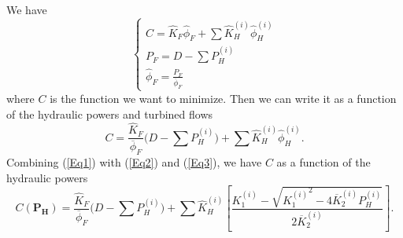 \documentclass[12pt]{article}
\theoremstyle{definition}
\theoremstyle{remark}
\begin{document}
We have
\begin{equation*}
\begin{cases}
C=\hat{K}_F\hat{\phi}_F+\sum\hat{K}_H^{(i)}\hat{\phi}_H^{(i)}\\
P_F=D-\sum P_H^{(i)}\\
\hat{\phi}_F=\frac{P_F}{\overline{\phi}_F}
\end{cases}
\end{equation*}
where $C$ is the function we want to minimize. Then we can write it as a function of the hydraulic powers and turbined flows
\begin{equation}
C=\frac{\hat{K}_F}{\overline{\phi}_F}\Big(D-\sum P_H^{(i)}\Big)+\sum\hat{K}_H^{(i)}\hat{\phi}_H^{(i)}.
\label{Eq1}
\end{equation}
Combining (\ref{Eq1}) with (\ref{Eq2}) and (\ref{Eq3}), we have $C$ as a function of the hydraulic powers
\begin{equation}
C(\bm{P_H})=\frac{\hat{K}_F}{\overline{\phi}_F}\Big(D-\sum P_H^{(i)}\Big)+\sum\hat{K}_H^{(i)}\left[\frac{K_1^{(i)}-\sqrt{{K_1^{(i)}}^2-4\overline{K}_2^{(i)}P_H^{(i)}}}{2\overline{K}_2^{(i)}}\right].
\label{Eq4}
\end{equation}
\end{document}
